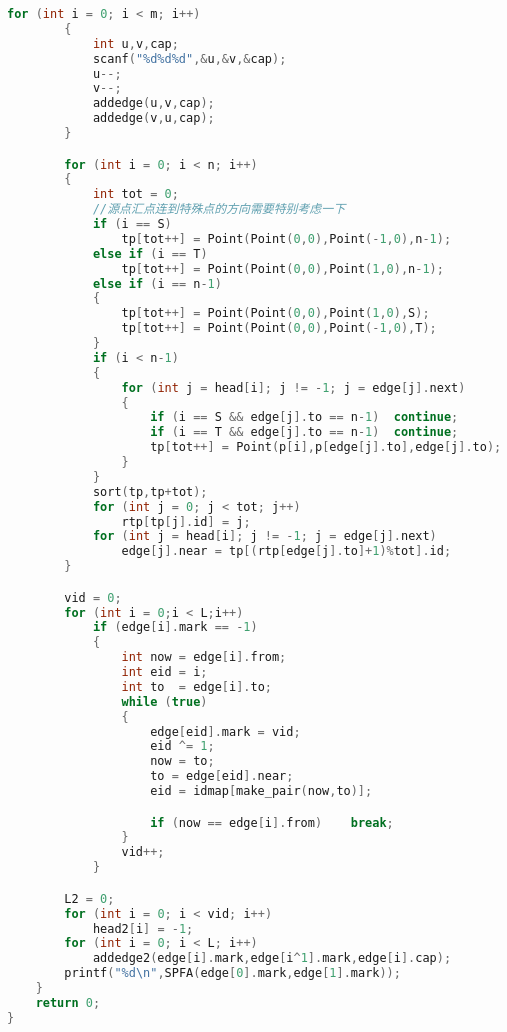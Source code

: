 \begin{lstlisting}[language=c++]
        for (int i = 0; i < m; i++)
        {
            int u,v,cap;
            scanf("%d%d%d",&u,&v,&cap);
            u--;
            v--;
            addedge(u,v,cap);
            addedge(v,u,cap);
        }

        for (int i = 0; i < n; i++)
        {
            int tot = 0;
            //源点汇点连到特殊点的方向需要特别考虑一下
            if (i == S)
                tp[tot++] = Point(Point(0,0),Point(-1,0),n-1);
            else if (i == T)
                tp[tot++] = Point(Point(0,0),Point(1,0),n-1);
            else if (i == n-1)
            {
                tp[tot++] = Point(Point(0,0),Point(1,0),S);
                tp[tot++] = Point(Point(0,0),Point(-1,0),T);
            }
            if (i < n-1)
            {
                for (int j = head[i]; j != -1; j = edge[j].next)
                {
                    if (i == S && edge[j].to == n-1)  continue;
                    if (i == T && edge[j].to == n-1)  continue;
                    tp[tot++] = Point(p[i],p[edge[j].to],edge[j].to);
                }
            }
            sort(tp,tp+tot);
            for (int j = 0; j < tot; j++)
                rtp[tp[j].id] = j;
            for (int j = head[i]; j != -1; j = edge[j].next)
                edge[j].near = tp[(rtp[edge[j].to]+1)%tot].id;
        }

        vid = 0;
        for (int i = 0;i < L;i++)
            if (edge[i].mark == -1)
            {
                int now = edge[i].from;
                int eid = i;
                int to  = edge[i].to;
                while (true)
                {
                    edge[eid].mark = vid;
                    eid ^= 1;
                    now = to;
                    to = edge[eid].near;
                    eid = idmap[make_pair(now,to)];

                    if (now == edge[i].from)    break;
                }
                vid++;
            }

        L2 = 0;
        for (int i = 0; i < vid; i++)
            head2[i] = -1;
        for (int i = 0; i < L; i++)
            addedge2(edge[i].mark,edge[i^1].mark,edge[i].cap);
        printf("%d\n",SPFA(edge[0].mark,edge[1].mark));
    }
    return 0;
}
    \end{lstlisting}